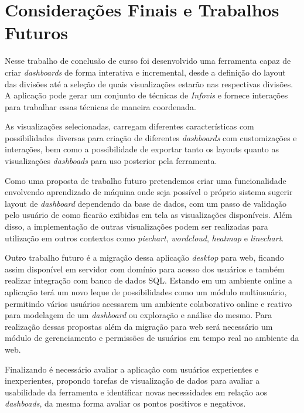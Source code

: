 \documentclass[
	12pt,				%
	openright,			%
	oneside,			%
	a4paper,			%
	english,			%
	brazil				%
	]{abntex2}
\begin{document}
\chapter{Considerações Finais e Trabalhos Futuros}
\label{ch:conclusao}

Nesse trabalho de conclusão de curso foi desenvolvido uma ferramenta capaz de criar \textit{dashboards} de forma interativa e incremental, desde a definição do layout das divisões até a seleção de quais visualizações estarão nas respectivas divisões. A aplicação pode gerar um conjunto de técnicas de \textit{Infovis} e fornece interações para trabalhar essas técnicas de maneira coordenada.  

As visualizações selecionadas, carregam diferentes características com possibilidades diversas para criação de diferentes \textit{dashboards} com customizações e interações, bem como a possibilidade de exportar tanto os layouts quanto as visualizações \textit{dashboads} para uso posterior pela ferramenta.

Como uma proposta de trabalho futuro pretendemos criar uma funcionalidade envolvendo aprendizado de máquina onde seja possível o próprio sistema sugerir layout de \textit{dashboard} dependendo da base de dados, com um passo de validação pelo usuário de como ficarão exibidas em tela as visualizações disponíveis. Além disso, a implementação de outras visualizações podem ser realizadas para utilização em outros contextos como \textit{piechart}, \textit{wordcloud}, \textit{heatmap} e \textit{linechart}.

Outro trabalho futuro é a migração dessa aplicação \textit{desktop} para web, ficando assim disponível em servidor com domínio para acesso dos usuários e também realizar integração com banco de dados SQL. Estando em um ambiente online a aplicação terá um novo leque de possibilidades como um módulo multiusuário, permitindo vários usuários acessarem um ambiente colaborativo online e reativo para modelagem de um \textit{dashboard} ou exploração e análise do mesmo. Para realização dessas propostas além da migração para web será necessário um módulo de gerenciamento e permissões de usuários em tempo real no ambiente da web.

Finalizando é necessário avaliar a aplicação com usuários experientes e inexperientes, propondo tarefas de visualização de dados para avaliar a usabilidade da ferramenta e identificar novas necessidades em relação aos \textit{dashboads}, da mesma forma avaliar os pontos positivos e negativos.
\end{document}
